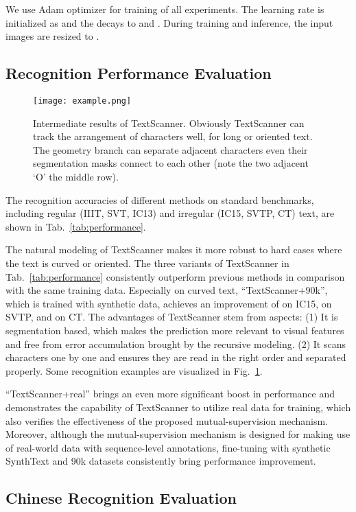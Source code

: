 \documentclass[letterpaper]{article} \usepackage{aaai20}  \usepackage{times}  \usepackage{helvet} \usepackage{courier}  \usepackage[hyphens]{url}  \usepackage{graphicx} \urlstyle{rm} \def\UrlFont{\rm}  \usepackage{graphicx}  \frenchspacing  \setlength{\pdfpagewidth}{8.5in}  \setlength{\pdfpageheight}{11in}
\begin{document}
We use Adam optimizer for training of all experiments. The learning rate is initialized as  and the decays to  and . During training and inference, the input images are resized to .

\subsection{Recognition Performance Evaluation}

\begin{figure}[!ht]
\centering
\texttt{[image: example.png]}
\caption{Intermediate results of TextScanner. Obviously TextScanner can track the arrangement of characters well, for long or oriented text. The geometry branch can separate adjacent characters even their segmentation masks connect to each other (note the two adjacent `O' the middle row).}
\label{fig:example}
\end{figure}

The recognition accuracies of different methods on standard benchmarks, including regular (IIIT, SVT, IC13) and irregular  (IC15, SVTP, CT) text, are shown in Tab.~\ref{tab:performance}. 

The natural modeling of TextScanner makes it more robust to hard cases where the text is curved or oriented. The three variants of TextScanner in Tab.~\ref{tab:performance} consistently outperform previous methods in comparison with the same training data.
Especially on curved text, ``TextScanner+90k'', which is trained with synthetic data, achieves an improvement of  on IC15,  on SVTP, and  on CT.
The advantages of TextScanner stem from aspects: (1) It is segmentation based, which makes the prediction more relevant to visual features and free from error accumulation brought by the recursive modeling. (2) It scans characters one by one and ensures they are read in the right order and separated properly. Some recognition examples are visualized in Fig.~\ref{fig:example}.


``TextScanner+real'' brings an even more significant boost in performance and demonstrates the capability of TextScanner to utilize real data for training, which also verifies the effectiveness of the proposed mutual-supervision mechanism. Moreover, although the mutual-supervision mechanism is designed for making use of real-world data with sequence-level annotations, fine-tuning with synthetic SynthText and 90k datasets consistently bring performance improvement.

\subsection{Chinese Recognition Evaluation}
\end{document}
